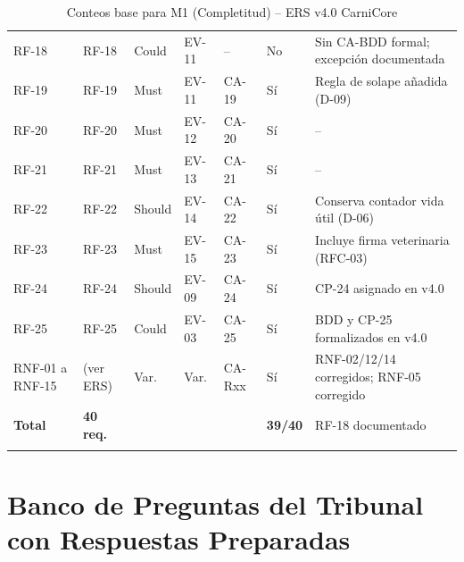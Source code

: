 \documentclass[11pt,a4paper]{article}
\begin{document}
\begin{longtable}{|p{1.2cm}|p{2cm}|p{1.5cm}|p{1.5cm}|p{1.5cm}|p{1.5cm}|p{3cm}|}
RF-18 & RF-18 & Could & EV-11 & -- & No & Sin CA-BDD formal; excepción documentada \\
RF-19 & RF-19 & Must & EV-11 & CA-19 & Sí & Regla de solape añadida (D-09) \\
RF-20 & RF-20 & Must & EV-12 & CA-20 & Sí & -- \\
RF-21 & RF-21 & Must & EV-13 & CA-21 & Sí & -- \\
RF-22 & RF-22 & Should & EV-14 & CA-22 & Sí & Conserva contador vida útil (D-06) \\
RF-23 & RF-23 & Must & EV-15 & CA-23 & Sí & Incluye firma veterinaria (RFC-03) \\
RF-24 & RF-24 & Should & EV-09 & CA-24 & Sí & CP-24 asignado en v4.0 \\
RF-25 & RF-25 & Could & EV-03 & CA-25 & Sí & BDD y CP-25 formalizados en v4.0 \\
RNF-01 a RNF-15 & (ver ERS) & Var. & Var. & CA-Rxx & Sí & RNF-02/12/14 corregidos; RNF-05 corregido \\
\hline
\textbf{Total} & \textbf{40 req.} & & & & \textbf{39/40} & RF-18 documentado \\
\hline
\caption{Conteos base para M1 (Completitud) -- ERS v4.0 CarniCore}
\end{longtable}

\section{Banco de Preguntas del Tribunal con Respuestas Preparadas}
\label{anx:preguntas}
\end{document}
